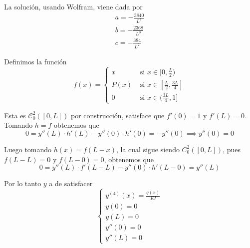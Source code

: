 \documentclass[a4paper,oneside,10.5pt]{USMArt}
\begin{document}
\begin{sol}
  La solución, usando Wolfram, viene dada por
  \begin{gather*}
    a = -\frac{3840}{L^{4}}\\
    b = -\frac{2368}{L^{3}}\\
    c = -\frac{384}{L^{2}}
  \end{gather*}

  Definimos la función
  \begin{equation*}
    f(x) = \begin{cases}
      x & \text{ si } x \in [0, \frac{L}{2})\\
      P(x) & \text{ si } x \in [\frac{L}{2}, \frac{3L}{4}]\\
      0 & \text{ si } x \in (\frac{3L}{4}, 1]
    \end{cases}
  \end{equation*}

  Esta es $\mathcal{C}^{2}_{0}([0, L])$ por construcción, satisface que $f'(0) = 1$ y $f'(L) = 0$. Tomando $h = f$
  obtenemos que
  \begin{equation*}
    0 = y''(L) \cdot h'(L) - y''(0) \cdot h'(0) = -y''(0) \implies y''(0) = 0
  \end{equation*}

  Luego tomando $h(x) = f(L - x)$, la cual sigue siendo $C^{2}_{0}([0, L])$, pues $f(L - L) = 0$ y $f(L - 0) = 0$,
  obtenemos que
  \begin{equation*}
    0 = y''(L) \cdot f'(L - L) - y''(0) \cdot h'(L - 0) = y''(L)
  \end{equation*}

  Por lo tanto $y$ a de satisfacer
  \begin{equation*}
    \begin{cases}
      y^{(4)}(x) = \frac{q(x)}{EI}\\
      y(0) = 0\\
      y(L) = 0\\
      y''(0) = 0\\
      y''(L) = 0
    \end{cases}
  \end{equation*}
\end{sol}
\end{document}
